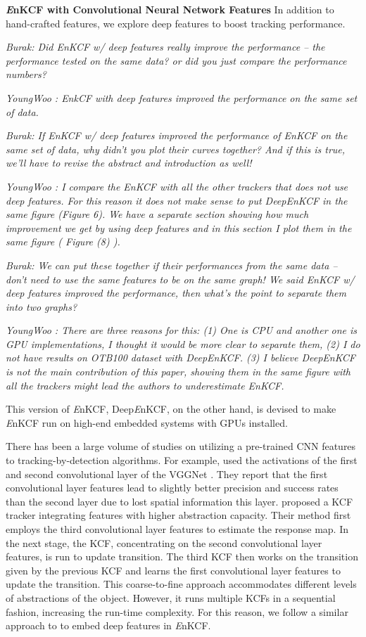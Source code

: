 \documentclass[10pt,twocolumn,letterpaper]{article}
\begin{document}
\textbf{{\it E}nKCF with Convolutional Neural Network Features} In
addition to hand-crafted features, we explore deep features to boost
tracking performance. 

{\it Burak: Did EnKCF w/ deep features really
  improve the performance -- the performance tested on the same data?
  or did you just compare the performance numbers?}  

{\it YoungWoo :
  EnkCF with deep features improved the performance on the same set of
  data.}  

{\it Burak: If EnKCF w/ deep features improved the performance of
  EnKCF on the same set of data, why didn't you plot their curves
  together? And if this is true, we'll have to revise the abstract and
  introduction as well!}
  
  {\it YoungWoo : I compare the EnKCF with all the other trackers that does not use deep features. For this reason
  it does not make sense to put DeepEnKCF in the same figure (Figure 6). We have a separate section 
  showing how much improvement we get by using deep features and in this section I plot them in the same figure ( Figure (8) ).}  

{\it Burak: We can put these together if their performances from the
  same data -- don't need to use the same features to be on the same
  graph! We said EnKCF w/ deep features improved the performance, then
  what's the point to separate them into two graphs?}
  
{\it YoungWoo : There are three reasons for this: (1) One is CPU and another one is GPU
implementations, I thought it would be more clear to separate them, (2) I do not have 
results on OTB100 dataset with DeepEnKCF. (3) I believe DeepEnKCF is not the main contribution 
of this paper, showing them in the same figure with all the trackers might lead the authors to 
underestimate EnKCF.
 }
  
This version of {\it E}nKCF, Deep{\it E}nKCF, on the other hand, is
devised to make {\it E}nKCF run on high-end embedded systems with GPUs
installed.

There has been a large volume of studies on utilizing a pre-trained
CNN features to tracking-by-detection algorithms. For example,
\cite{danelljan2015convolutional} used the activations of the first
and second convolutional layer of the VGGNet \cite{simonyan2014very}.
They report that the first convolutional layer features lead to
slightly better precision and success rates than the second layer due
to lost spatial information this layer. \cite{ma2015hierarchical}
proposed a KCF tracker integrating features with higher abstraction
capacity.  Their method first employs the third convolutional layer
features to estimate the response map. In the next stage, the KCF,
concentrating on the second convolutional layer features, is run to
update transition. The third KCF then works on the transition given by
the previous KCF and learns the first convolutional layer features to
update the transition. This coarse-to-fine approach accommodates
different levels of abstractions of the object. However, it runs
multiple KCFs in a sequential fashion, increasing the run-time
complexity. For this reason, we follow a similar approach to
\cite{danelljan2015convolutional} to embed deep features in {\it
  E}nKCF.
\end{document}
